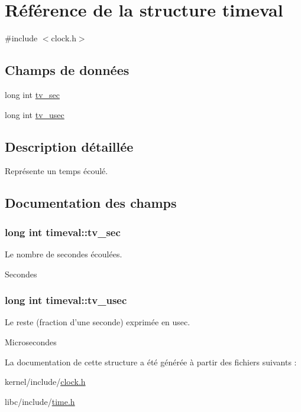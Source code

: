 \hypertarget{structtimeval}{\section{Référence de la structure timeval}
\label{structtimeval}
}


{\ttfamily \#include $<$clock.\+h$>$}

\subsection*{Champs de données}
\begin{DoxyCompactItemize}
\item 
long int \hyperlink{structtimeval_ab6fac84a084d017bb157f4681dafe8a3}{tv\+\_\+sec}
\item 
long int \hyperlink{structtimeval_a6f90a236deb00a89fe3dd8023d525d9c}{tv\+\_\+usec}
\end{DoxyCompactItemize}


\subsection{Description détaillée}
Représente un temps écoulé. 

\subsection{Documentation des champs}
\hypertarget{structtimeval_ab6fac84a084d017bb157f4681dafe8a3}{
\subsubsection[{tv\+\_\+sec}]{\setlength{\rightskip}{0pt plus 5cm}long int timeval\+::tv\+\_\+sec}}\label{structtimeval_ab6fac84a084d017bb157f4681dafe8a3}
Le nombre de secondes écoulées.

Secondes \hypertarget{structtimeval_a6f90a236deb00a89fe3dd8023d525d9c}{
\subsubsection[{tv\+\_\+usec}]{\setlength{\rightskip}{0pt plus 5cm}long int timeval\+::tv\+\_\+usec}}\label{structtimeval_a6f90a236deb00a89fe3dd8023d525d9c}
Le reste (fraction d'une seconde) exprimée en usec.

Microsecondes 

La documentation de cette structure a été générée à partir des fichiers suivants \+:\begin{DoxyCompactItemize}
\item 
kernel/include/\hyperlink{clock_8h}{clock.\+h}\item 
libc/include/\hyperlink{time_8h}{time.\+h}\end{DoxyCompactItemize}
